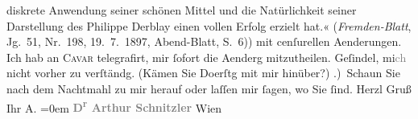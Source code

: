 \begin{ledgroupsized}[t]{13cm}
{{{                     diskrete Anwendung seiner schönen Mittel und die Natürlichkeit seiner
                     Darstellung des Philippe Derblay einen vollen Erfolg erzielt hat.« (\emph{Fremden-Blatt}, Jg. 51, Nr. 198,
                        19. 7. 1897, Abend-Blatt, S. 6)}}}\label{K_L00707-1h}) mit cenſurellen
               Aenderungen. Ich hab an \textsc{Cavar} telegrafirt, mir {\pb}ſofort die Aenderg
               mitzutheilen. Geſindel, mi\textcolor{gray}{ch} nicht vorher zu verſtändg. (Kämen Sie
                     Do{\geminationn}erſtg mit mir hinüber?)\pend
           .) Schaun Sie nach dem Nachtmahl zu mir herauf oder laſſen mir ſagen, wo Sie
               ſind.\pend
           \pstart
           Herzl Gruß{\\[\baselineskip]}Ihr \spacefill\mbox{A.}\pend
           \leftskip=0em{}\pstart
           \noindent{}\centering{}\textcolor{gray}{\textbf{D\textsuperscript{r} Arthur Schnitzler}}\pend
           \pstart
           \noindent{}\raggedleft{}Wien\pend
           
         
         \endnumbering{}\end{ledgroupsized}  \newcommand{\dateiname}{L00707}\newcommand{\titel}{Arthur Schnitzler an Richard Beer-Hofmann, 20. 7. 1897}\newcommand{\editorInnen}{Martin Anton Müller und Gerd-Hermann Susen}
      